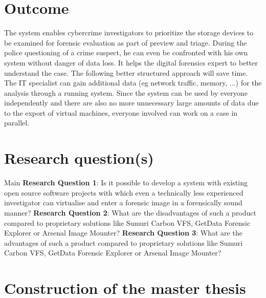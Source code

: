 \section{Outcome}


The system enables cybercrime investigators to prioritize the storage devices to be examined for forensic evaluation as part of preview and triage.
During the police questioning of a crime suspect, he can even be confronted with his own system without danger of data loss.
It helps the digital forensics expert to better understand the case. The following better structured approach will save time.
The IT specialist can gain additional data (eg network traffic, memory, ...) for the analysis through a running system.
Since the system can be used by everyone independently and there are also no more unnecessary large amounts of data due to the export of virtual machines, everyone involved can work on a case in parallel.

\section{Research question(s)}

Main \textbf{Research Question 1}:\newline
\newline
\noindent Is it possible to develop a system with existing open source software projects with which even a technically less experienced investigator can virtualise and enter a forensic image in a forensically sound manner?\newline
\newline
\noindent \textbf{Research Question 2}:\newline
\newline
\noindent What are the disadvantages of such a product compared to proprietary solutions like Sumuri Carbon VFS, GetData Forensic Explorer or Arsenal Image Mounter?\newline
\newline
\noindent \textbf{Research Question 3}:\newline
\newline
\noindent What are the advantages of such a product compared to proprietary solutions like Sumuri Carbon VFS, GetData Forensic Explorer or Arsenal Image Mounter?

\section{Construction of the master thesis}

